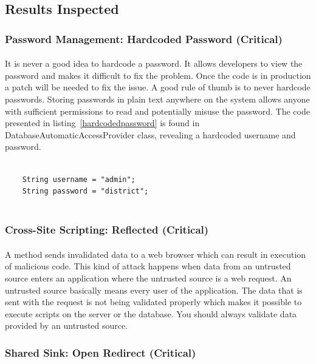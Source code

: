 \documentclass[11pt,english,a4paper]{report}
\begin{document}
\subsection{Results Inspected}
\subsubsection{Password Management: Hardcoded Password (Critical)}
\paragraph{}
It is never a good idea to hardcode a password.
It allows developers to view the password and makes it difficult to fix the problem. 
Once the code is in production a patch will be needed to fix the issue.
A good rule of thumb is to never hardcode passwords.
Storing passwords in plain text anywhere on the system allows anyone with sufficient permissions to read and potentially misuse the password.
The code presented in listing~\ref{hardcodedpassword} is found in DatabaseAutomaticAccessProvider class, revealing a hardcoded username and password.

\begin{lstlisting}[caption=Hardcoded username and password, label=hardcodedpassword]

	String username = "admin";
	String password = "district";
	
\end{lstlisting}


\subsubsection{Cross-Site Scripting: Reflected (Critical)}
\paragraph{}
A method sends invalidated data to a web browser which can result in execution of malicious code.
This kind of attack happens when data from an untrusted source enters an application where the untrusted source is a web request.
An untrusted source basically means every user of the application.
The data that is sent with the request is not being validated properly which makes it possible to execute scripts on the server or the database.
You should always validate data provided by an untrusted source.


\subsubsection{Shared Sink: Open Redirect (Critical)}
\end{document}
